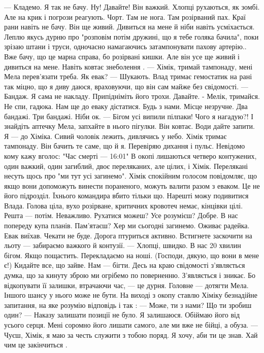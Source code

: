 — Кладемо. Я так не бачу. Ну! Давайте! Він важкий. 
Хлопці рухаються, як зомбі. Але на крик і погрози реагують. 
Чорт. Там не нога. Там розірваний пах. Краї рани навіть не бачу. Він ще живий. Дивиться на мене й ніби навіть усміхається. Леплю якусь дурню про "розповім потім дружині, що я тебе голяка бачила", поки зрізаю штани і труси, одночасно намагаючись затампонувати  пахову артерію.. Вже бачу, що це марна справа,  бо розірвані кишки. Але він усе ще живий і дивиться на мене. Навіть ковтає знеболення . 
— Хімік, тримай тампонаду, мені Мела перев'язати треба. Як евак?
— Шукають.
Влад тримає гемостатик на рані так міцно, що я диву даюся, враховуючи, що він сам майже без свідомості. 
— Бандаж. Я сама не накладу. Припідніміть його трохи. Давайте. 
- Мелік, тримайся. Не спи, гадюка. Нам ще до еваку дістатися. Будь з нами. 
Місце незручне. Два бандажі. Три бандажі. Ніби ок. 
— Бігом усі випили пілпаки! Чого я нагадую?! І знайдіть аптечку Мела, запхайте в нього пігулки. Він ковтає. Води дайте запити.  Я — до Хіміка. 
Сивий чоловік лежить, дивлячись у небо. Хімік тримає тампонаду.  Він бачить те саме, що й я. Перевіряю дихання і пульс. Невідомо кому кажу вголос: "Час смерті — 16:01" 
В окопі лишаються четверо контужених,  один важкий, один загиблий, двоє переляканих, але цілих, і Хімік.  Перелякані несуть щось про "ми тут усі загинемо". Хімік спокійним голосом повідомляє, що якщо вони допоможуть винести пораненого, можуть валити разом з еваком. Це не його підрозділ. Їхнього командира вбито тільки що. 
Нарешті можу подивитися Влада. Голова ціла, вухо розірване, критичних кровотеч немає, кінцівки цілі. Решта — потім. Неважливо. Рухатися можеш? Усе розумієш? Добре. В нас попереду купа планів. Пам'ятаєш? Хер ми сьогодні загинемо. 
Оживає радейка. Евак виїхав. Чекати не буде. Дорога птуриться активно. Встигнете заскочити на льоту — забираємо важкого й контузії.
— Хлопці, швидко. В нас 20 хвилин бігом. Якщо пощастить. Перекладаємо на ноші. (Господи, дякую, що вони в мене є!) Кидайте все, що зайве. Нам — бігти. 
Десь на краю свідомості з'являється думка, що за кинуту зброю ми  огрібемо по поверненню. З'являється і зникає. Бо відкопувати її залишки, втрачаючи час, — це дурня. Головне — дотягти Мела. Іншого шансу у нього може не бути. 
На виході з окопу ставлю Хіміку безнадійне запитання, на яке розумію  відповідь і так :
— Може, ти з нами? Що ти зробиш один?
— Наказу залишати позиції не було. Я залишаюся. 
Обіймаю його від усього серця.  Мені соромно його лишати самого, але ми вже не бійці, а обуза. 
— Чуєш, Хімік, я маю за честь служити з тобою поряд. Я хочу, аби ти це знав. Хай чим це закінчиться . 
